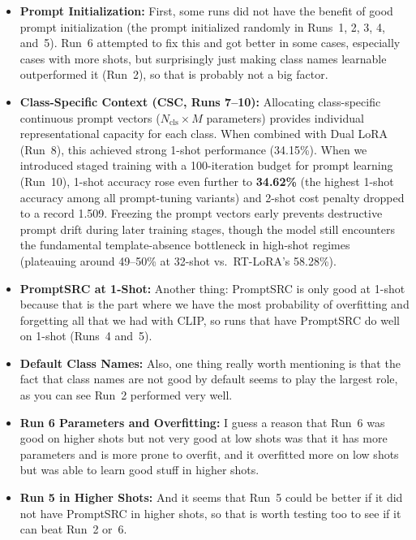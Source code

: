 \documentclass[letterpaper,11pt,leqno]{article}
\begin{document}
\begin{itemize}
\item \textbf{Prompt Initialization:}
      First, some runs did not have the benefit of good prompt initialization (the prompt initialized randomly in Runs~1, 2, 3, 4, and~5). Run~6 attempted to fix this and got better in some cases, especially cases with more shots, but surprisingly just making class names learnable outperformed it (Run~2), so that is probably not a big factor.

\item \textbf{Class-Specific Context (CSC, Runs 7--10):}
      Allocating class-specific continuous prompt vectors ($N_\text{cls} \times M$ parameters) provides individual representational capacity for each class. When combined with Dual LoRA (Run~8), this achieved strong 1-shot performance (34.15\%). When we introduced staged training with a 100-iteration budget for prompt learning (Run~10), 1-shot accuracy rose even further to \textbf{34.62\%} (the highest 1-shot accuracy among all prompt-tuning variants) and 2-shot cost penalty dropped to a record 1.509. Freezing the prompt vectors early prevents destructive prompt drift during later training stages, though the model still encounters the fundamental template-absence bottleneck in high-shot regimes (plateauing around 49--50\% at 32-shot vs.\ RT-LoRA's 58.28\%).

\item \textbf{PromptSRC at 1-Shot:}
      Another thing: PromptSRC is only good at 1-shot because that is the part where we have the most probability of overfitting and forgetting all that we had with CLIP, so runs that have PromptSRC do well on 1-shot (Runs~4 and~5).

\item \textbf{Default Class Names:}
      Also, one thing really worth mentioning is that the fact that class names are not good by default seems to play the largest role, as you can see Run~2 performed very well.

\item \textbf{Run 6 Parameters and Overfitting:}
      I guess a reason that Run~6 was good on higher shots but not very good at low shots was that it has more parameters and is more prone to overfit, and it overfitted more on low shots but was able to learn good stuff in higher shots.

\item \textbf{Run 5 in Higher Shots:}
      And it seems that Run~5 could be better if it did not have PromptSRC in higher shots, so that is worth testing too to see if it can beat Run~2 or~6.


\end{itemize}
\end{document}
